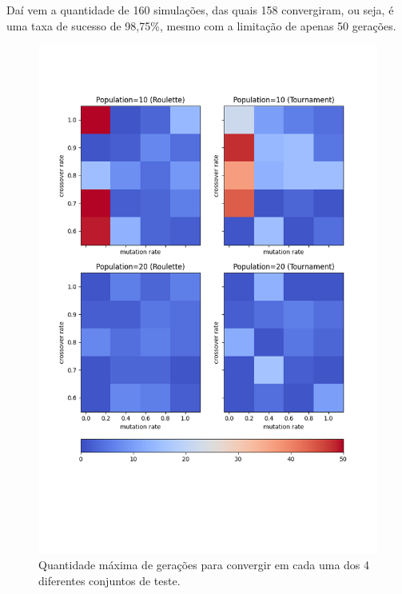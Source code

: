 \documentclass[12pt]{article}
\begin{document}
Daí vem a quantidade de 160 simulações, das quais 158 convergiram, ou seja, é uma taxa de sucesso de 98,75\%, mesmo com a limitação de apenas 50 gerações.

\begin{figure}
    \centering
    \includegraphics{fig/max_colors.png}
    \caption{Quantidade máxima de gerações para convergir em cada uma dos 4 diferentes conjuntos de teste.}
    \label{fig:max}
\end{figure}
\end{document}

